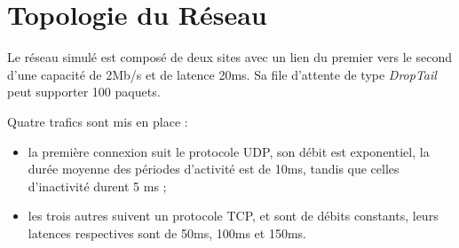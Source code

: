 
\section{Topologie du R\'eseau}

Le r\'eseau simul\'e est compos\'e de deux sites avec un lien du premier vers le second
d'une capacit\'e de 2Mb/s et de latence 20ms.
Sa file d'attente de type {\em DropTail} peut supporter 100 paquets.

Quatre trafics sont mis en place :
\begin{itemize}
	\item la premi\`ere connexion suit le protocole UDP, son d\'ebit est exponentiel, la
	dur\'ee moyenne des p\'eriodes d'activit\'e est de 10ms, tandis que celles
	d'inactivit\'e durent 5 ms ;
	\item les trois autres suivent un protocole TCP, et sont de d\'ebits constants, leurs
	latences respectives sont de 50ms, 100ms et 150ms.
\end{itemize}

